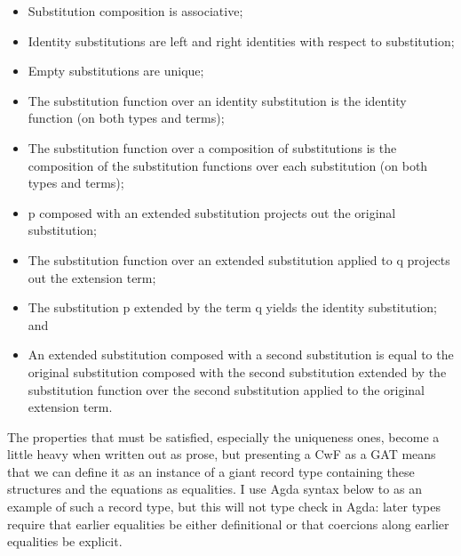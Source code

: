 \documentclass{article}
\renewcommand{\_}{\textrm{\textscale{.5}{\textunderscore}}}
\newcommand{\p}{\mathrm{p}}
\newcommand{\q}{\mathrm{q}}
\theoremstyle{definition}
\theoremstyle{plain}
\begin{document}
\begin{itemize}
    \item Substitution composition is associative;
    \item Identity substitutions are left and right identities with respect to substitution;
    \item Empty substitutions are unique;
    \item The substitution function over an identity substitution is the identity function (on both types and terms);
    \item The substitution function over a composition of substitutions is the composition
    of the substitution functions over each substitution (on both types and terms);
    \item $\p$ composed with an extended substitution projects out the original substitution;
    \item The substitution function over an extended substitution applied to $\q$ projects out the extension term;
    \item The substitution $\p$ extended by the term $\q$ yields the identity substitution; and
    \item An extended substitution composed with a second substitution is equal to
    the original substitution composed with the second substitution extended by the substitution function over the second substitution applied to the original extension term.
\end{itemize}

The properties that must be satisfied, especially the uniqueness ones,
become a little heavy when written out as prose,
but presenting a CwF as a GAT means that we can define it as an instance of a giant record type
containing these structures and the equations as equalities.
I use Agda syntax below to as an example of such a record type,
but this will not type check in Agda:
later types require that earlier equalities be either definitional
or that coercions along earlier equalities be explicit.
\end{document}
